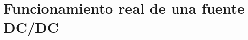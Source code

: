 \documentclass[e4_tp1_main.tex]{subfiles}
\begin{document}
\section{Funcionamiento real de una fuente DC/DC}
\newpage
\end{document}
